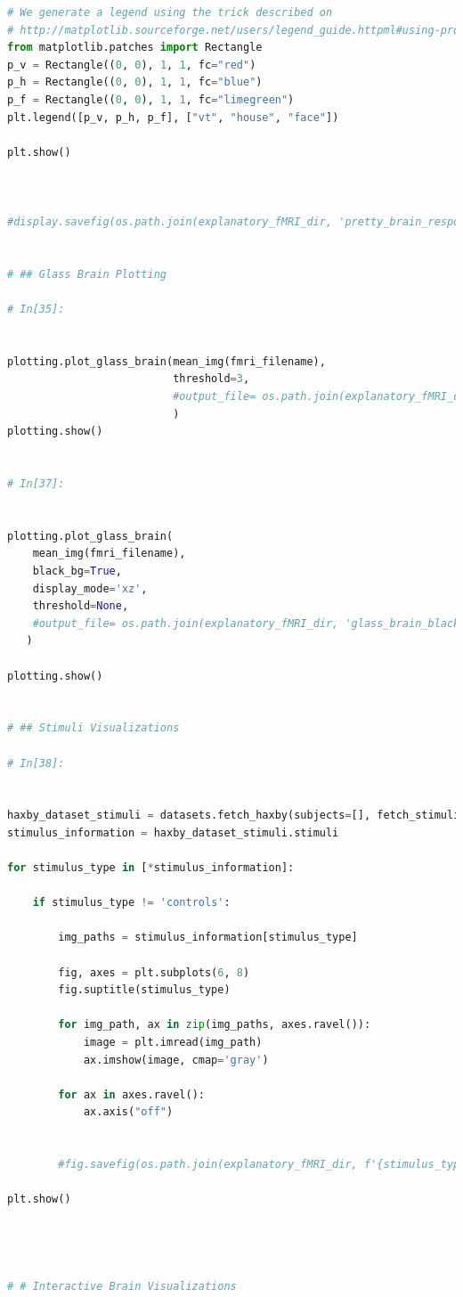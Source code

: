 \documentclass[10pt, twocolumn, letterpaper]{article}
\begin{document}
\begin{lstlisting}[language=Python]
# We generate a legend using the trick described on
# http://matplotlib.sourceforge.net/users/legend_guide.httpml#using-proxy-artist
from matplotlib.patches import Rectangle
p_v = Rectangle((0, 0), 1, 1, fc="red")
p_h = Rectangle((0, 0), 1, 1, fc="blue")
p_f = Rectangle((0, 0), 1, 1, fc="limegreen")
plt.legend([p_v, p_h, p_f], ["vt", "house", "face"])

plt.show()



#display.savefig(os.path.join(explanatory_fMRI_dir, 'pretty_brain_response.png'))


# ## Glass Brain Plotting 

# In[35]:


plotting.plot_glass_brain(mean_img(fmri_filename),
                          threshold=3,
                          #output_file= os.path.join(explanatory_fMRI_dir, 'glass_brain_white.png')
                          )
plotting.show()


# In[37]:


plotting.plot_glass_brain(
    mean_img(fmri_filename),
    black_bg=True,
    display_mode='xz',
    threshold=None,
    #output_file= os.path.join(explanatory_fMRI_dir, 'glass_brain_black.png')
   )

plotting.show()


# ## Stimuli Visualizations 

# In[38]:


haxby_dataset_stimuli = datasets.fetch_haxby(subjects=[], fetch_stimuli=True)
stimulus_information = haxby_dataset_stimuli.stimuli

for stimulus_type in [*stimulus_information]:
    
    if stimulus_type != 'controls':

        img_paths = stimulus_information[stimulus_type]
        
        fig, axes = plt.subplots(6, 8)
        fig.suptitle(stimulus_type)

        for img_path, ax in zip(img_paths, axes.ravel()):
            image = plt.imread(img_path)
            ax.imshow(image, cmap='gray')

        for ax in axes.ravel():
            ax.axis("off")
            
            
        #fig.savefig(os.path.join(explanatory_fMRI_dir, f'{stimulus_type}.png')) 

plt.show()
    
    


# # Interactive Brain Visualizations 


\end{lstlisting}
\end{document}
